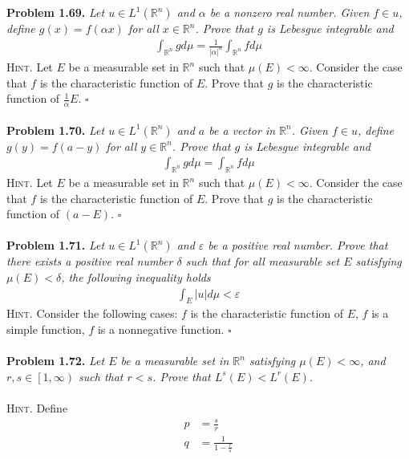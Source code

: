 \documentclass[a4paper]{article}
\numberwithin{equation}{section}
\begin{document}
\textbf{Problem 1.69.} \textit{Let $u \in {L^1}\left( {{\mathbb{R}^n}} \right)$ and $\alpha$ be a nonzero real number. Given $f\in u$, define $g\left( x \right) = f\left( {\alpha x} \right)$ for all $x\in \mathbb{R}^n$. Prove that $g$ is Lebesgue integrable and}
\begin{align}
\int_{{\mathbb{R}^n}} {gd\mu }  = \frac{1}{{{{\left| \alpha  \right|}^n}}}\int_{{\mathbb{R}^n}} {fd\mu } 
\end{align}
\textsc{Hint.} Let $E$ be a measurable set in $\mathbb{R}^n$ such that $\mu\left(E\right)<\infty$. Consider the case that $f$ is the characteristic function of $E$. Prove that $g$ is the characteristic function of $\frac{1}{\alpha}E$. \hfill $\square$\\
\\
\textbf{Problem 1.70.} \textit{Let $u \in {L^1}\left( {{\mathbb{R}^n}} \right)$ and $a$ be a vector in $\mathbb{R}^n$. Given $f\in u$, define $g\left(y\right)=f\left(a-y\right)$ for all $y\in \mathbb{R}^n$. Prove that $g$ is Lebesgue integrable and}
\begin{align}
\int_{{\mathbb{R}^n}} {gd\mu }  = \int_{{\mathbb{R}^n}} {fd\mu } 
\end{align}
\textsc{Hint.} Let $E$ be a measurable set in $\mathbb{R}^n$ such that $\mu\left(E\right)<\infty$. Consider the case that $f$ is the characteristic function of $E$. Prove that $g$ is the characteristic function of $\left(a-E\right)$. \hfill $\square$\\
\\
\textbf{Problem 1.71.} \textit{Let $u\in L^1\left(\mathbb{R}^n\right)$ and $\varepsilon$ be a positive real number. Prove that there exists a positive real number $\delta$ such that for all measurable set $E$ satisfying $\mu\left(E\right)<\delta$, the following inequality holds}
\begin{align}
\int_E {\left| u \right|d\mu }  < \varepsilon 
\end{align}
\textsc{Hint.} Consider the following cases: $f$ is the characteristic function of $E$, $f$ is a simple function, $f$ is a nonnegative function. \hfill $\square$\\
\\
\textbf{Problem 1.72.} \textit{Let $E$ be a measurable set in $\mathbb{R}^n$ satisfying $\mu\left(E\right)<\infty$, and $r,s\in \left[1,\infty\right)$ such that $r<s$. Prove that $L^s\left(E\right)<L^r\left(E\right)$.}\\
\\
\textsc{Hint.} Define 
\begin{align}
p &= \frac{s}{r}\\
q &= \frac{1}{{1 - \frac{r}{s}}}
\end{align}
\end{document}
